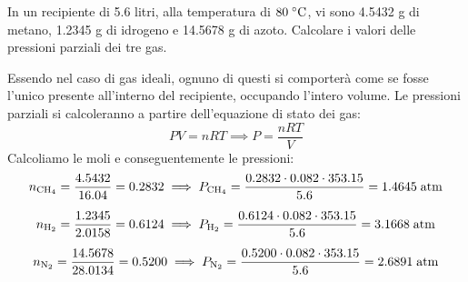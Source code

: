 \begin{esercizio}
    In un recipiente di 5.6 litri, alla temperatura di $80 \; ^{\circ} \rm C$, vi sono 4.5432 g di metano, 1.2345 g di idrogeno e 14.5678 g di azoto. Calcolare i valori delle pressioni parziali dei tre gas.
\end{esercizio}
\begin{soluzione}
    Essendo nel caso di gas ideali, ognuno di questi si comporterà come se fosse l'unico presente all'interno del recipiente, occupando l'intero volume. Le pressioni parziali si calcoleranno a partire dell'equazione di stato dei gas:
    \begin{equation*}
        PV=nRT
        \implies
        P=\frac{nRT}{V}
    \end{equation*}
    Calcoliamo le moli e conseguentemente le pressioni:
    \begin{gather*}
        n_{\rm CH_4}
        =\frac{4.5432}{16.04}
        =0.2832
        \implies
        P_{\rm CH_4}
        =\frac{0.2832 \cdot 0.082 \cdot 353.15}{5.6}
        =1.4645 \; \rm atm
        \\[0.2cm]
        n_{\rm H_2}
        =\frac{1.2345}{2.0158}
        =0.6124
        \implies
        P_{\rm H_2}
        =\frac{0.6124 \cdot 0.082 \cdot 353.15}{5.6}
        =3.1668 \; \rm atm
        \\[0.2cm]
        n_{\rm N_2}
        =\frac{14.5678}{28.0134}
        =0.5200
        \implies
        P_{\rm N_2}
        =\frac{0.5200 \cdot 0.082 \cdot 353.15}{5.6}
        =2.6891 \; \rm atm
    \end{gather*}
\end{soluzione}

\newpage

